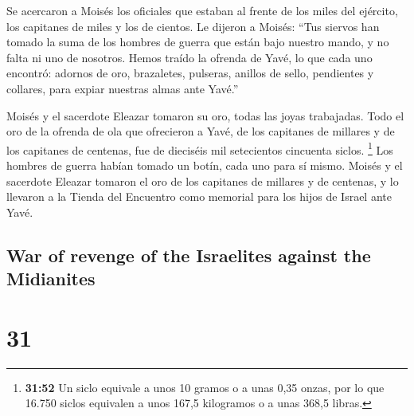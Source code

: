 \begin{paracol}{2}
 Se acercaron a Moisés los oficiales que estaban al
frente de los miles del ejército, los capitanes de miles y los de
cientos.  Le dijeron a Moisés: ``Tus siervos han tomado
la suma de los hombres de guerra que están bajo nuestro mando, y no
falta ni uno de nosotros.  Hemos traído la ofrenda de
Yavé, lo que cada uno encontró: adornos de oro, brazaletes, pulseras,
anillos de sello, pendientes y collares, para expiar nuestras almas ante
Yavé.''

 Moisés y el sacerdote Eleazar tomaron su oro, todas las
joyas trabajadas.  Todo el oro de la ofrenda de ola que
ofrecieron a Yavé, de los capitanes de millares y de los capitanes de
centenas, fue de dieciséis mil setecientos cincuenta siclos. \footnote{\textbf{31:52}
  Un siclo equivale a unos 10 gramos o a unas 0,35 onzas, por lo que
  16.750 siclos equivalen a unos 167,5 kilogramos o a unas 368,5 libras.}
 Los hombres de guerra habían tomado un botín, cada uno
para sí mismo.  Moisés y el sacerdote Eleazar tomaron el
oro de los capitanes de millares y de centenas, y lo llevaron a la
Tienda del Encuentro como memorial para los hijos de Israel ante Yavé.

\switchcolumn
\begin{otherlanguage}{english}

\hypertarget{war-of-revenge-of-the-israelites-against-the-midianites}{%
\subsection{War of revenge of the Israelites against the
Midianites}\label{war-of-revenge-of-the-israelites-against-the-midianites}}

\hypertarget{section-61}{%
\section{31}\label{section-61}}


\end{otherlanguage}
\end{paracol}

